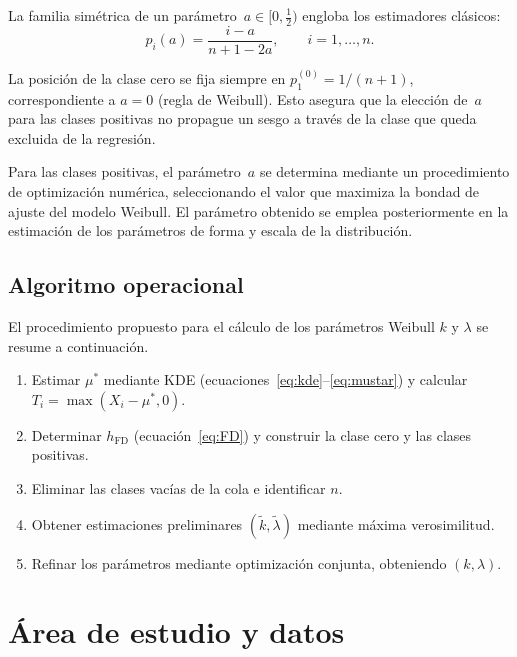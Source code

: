 \documentclass[APA,STIX1COL]{WileyNJD-v2}
\begin{document}
{La familia sim\'etrica de un par\'ametro~$a\in[0,\tfrac{1}{2})$ engloba
los estimadores cl\'asicos:
\begin{equation}\label{eq:familia}
p_i(a) = \frac{i-a}{n + 1 - 2a},\qquad i=1,\ldots,n.
\end{equation}

\medskip
La posici\'on de la clase cero se fija siempre en
$p_1^{(0)}=1/(n+1)$, correspondiente a $a=0$ (regla de Weibull).
Esto asegura que la elecci\'on de~$a$ para las clases positivas no
propague un sesgo a trav\'es de la clase que queda excluida de la regresi\'on.

Para las clases positivas, el parámetro~$a$ se determina mediante un
procedimiento de optimización numérica, seleccionando el valor que
maximiza la bondad de ajuste del modelo Weibull. El parámetro obtenido
se emplea posteriormente en la estimación de los parámetros de forma y
escala de la distribución.

\subsection{Algoritmo operacional}\label{subsec:algoritmo}

El procedimiento propuesto para el cálculo de los parámetros Weibull $k$ y $\lambda$ se resume a continuación.

\begin{enumerate}
\item Estimar $\mu^*$ mediante KDE (ecuaciones~\eqref{eq:kde}--\eqref{eq:mustar})
  y calcular $T_i=\max(X_i-\mu^*,0)$.
\item Determinar $h_{\mathrm{FD}}$ (ecuaci\'on~\eqref{eq:FD}) y
  construir la clase cero y las clases positivas.
\item Eliminar las clases vac\'ias de la cola e identificar $n$.
\item Obtener estimaciones preliminares $(\tilde{k},\tilde{\lambda})$ mediante m\'axima verosimilitud.
\item Refinar los par\'ametros mediante optimizaci\'on conjunta, obteniendo
$(k,\lambda)$.
\end{enumerate}

\section{\'Area de estudio y datos}

}
\end{document}
